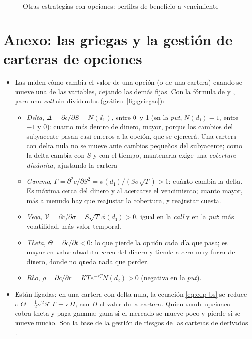 \documentclass[11pt]{article}
\begin{document}
\begin{figure}[H]
\centering
\caption{Otras estrategias con opciones: perfiles de beneficio a vencimiento}\label{fig:estrategias-anexo}
\end{figure}

\section{Anexo: las griegas y la gestión de carteras de opciones}\label{anexo:griegas}

\begin{itemize}
\item Las  miden cómo cambia el valor de una opción (o de una cartera) cuando se mueve una de las variables, dejando las demás fijas. Con la fórmula de  y , para una \emph{call} sin dividendos\nocite{Hull2022Options} (gráfico~\ref{fig:griegas}):
  \begin{itemize}
  \item \emph{Delta}, $\Delta=\partial c/\partial S=N(d_1)$, entre 0~y 1 (en la \emph{put}, $N(d_1)-1$, entre $-1$ y 0): cuanto más dentro de dinero, mayor, porque los cambios del subyacente pasan casi enteros a la opción, que se ejercerá. Una cartera con delta nula no se mueve ante cambios pequeños del subyacente; como la delta cambia con $S$ y con el tiempo, mantenerla exige una \emph{cobertura dinámica}, ajustando la cartera.
  \item \emph{Gamma}, $\Gamma=\partial^2c/\partial S^2=\phi(d_1)/(S\sigma\sqrt{T})>0$: cuánto cambia la delta. Es máxima cerca del dinero y al acercarse el vencimiento; cuanto mayor, más a menudo hay que reajustar la cobertura, y reajustar cuesta.
  \item \emph{Vega}, $\mathcal{V}=\partial c/\partial\sigma=S\sqrt{T}\,\phi(d_1)>0$, igual en la \emph{call} y en la \emph{put}: más volatilidad, más valor temporal.
  \item \emph{Theta}, $\Theta=\partial c/\partial t<0$: lo que pierde la opción cada día que pasa; es mayor en valor absoluto cerca del dinero y tiende a cero muy fuera de dinero, donde no queda nada que perder.
  \item \emph{Rho}, $\rho=\partial c/\partial r=KTe^{-rT}N(d_2)>0$ (negativa en la \emph{put}).
  \end{itemize}
\item Están ligadas: en una cartera con delta nula, la ecuación \eqref{eq:edp-bs} se reduce a $\Theta+\tfrac12\sigma^2S^2\,\Gamma=r\,\Pi$, con $\Pi$ el valor de la cartera. Quien vende opciones cobra theta y paga gamma: gana si el mercado se mueve poco y pierde si se mueve mucho. Son la base de la gestión de riesgos de las carteras de derivados .
\end{itemize}
\end{document}
